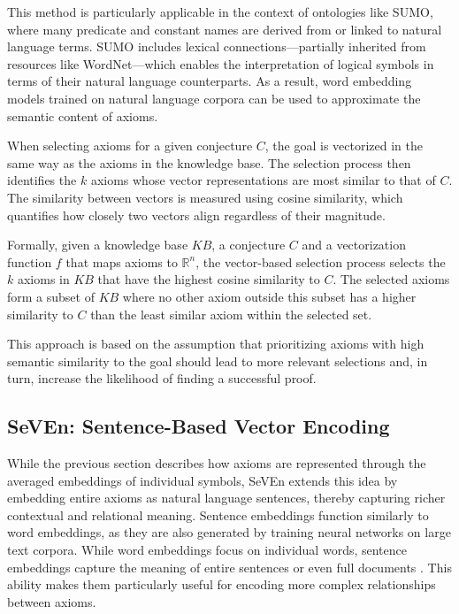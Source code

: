 \documentclass[english,version-2020-11]{uzl-thesis}
\begin{document}
This method is particularly applicable in the context of ontologies like SUMO, where many predicate and constant names are derived from or linked to natural language terms. SUMO includes lexical connections—partially inherited from resources like WordNet—which enables the interpretation of logical symbols in terms of their natural language counterparts. As a result, word embedding models trained on natural language corpora can be used to approximate the semantic content of axioms.

When selecting axioms for a given conjecture \( C \), the goal is vectorized in the same way as the axioms in the knowledge base. The selection process then identifies the \( k \) axioms whose vector representations are most similar to that of \( C \). The similarity between vectors is measured using cosine similarity, which quantifies how closely two vectors align regardless of their magnitude.

Formally, given a knowledge base \( KB \), a conjecture \( C \) and a vectorization function \( f \) that maps axioms to \( \mathbb{R}^n \), the vector-based selection process selects the \( k \) axioms in \( KB \) that have the highest cosine similarity to \( C \). The selected axioms form a subset of \( KB \) where no other axiom outside this subset has a higher similarity to \( C \) than the least similar axiom within the selected set.

This approach is based on the assumption that prioritizing axioms with high semantic similarity to the goal should lead to more relevant selections and, in turn, increase the likelihood of finding a successful proof.


\subsection{SeVEn: Sentence-Based Vector Encoding}

While the previous section describes how axioms are represented through the averaged embeddings of individual symbols, SeVEn extends this idea by embedding entire axioms as natural language sentences, thereby capturing richer contextual and relational meaning. Sentence embeddings function similarly to word embeddings, as they are also generated by training neural networks on large text corpora. While word embeddings focus on individual words, sentence embeddings capture the meaning of entire sentences or even full documents \cite{Kiros2015SkipThought}. This ability makes them particularly useful for encoding more complex relationships between axioms.
\end{document}
